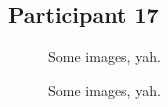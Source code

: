 \clearpage

\subsection{Participant 17}

\begin{figure}[h]
	\caption{Some images, yah.}
\end{figure}

\lipsum[1]

\clearpage

\begin{figure}[h]
	\caption{Some images, yah.}
\end{figure}

\lipsum[1]

